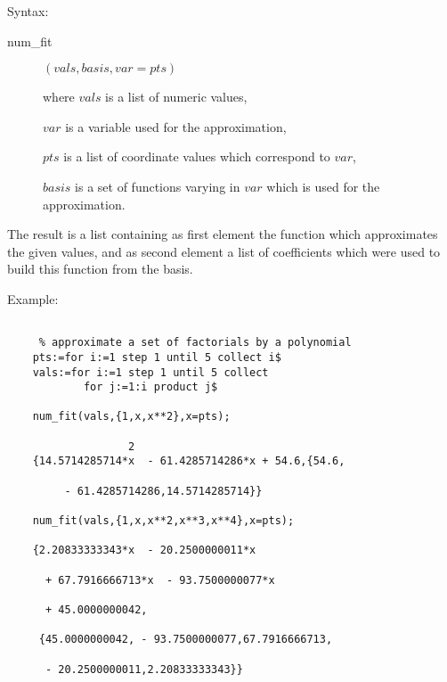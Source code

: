 Syntax:

\begin{description}
\item[num\_fit] $(vals,basis,var=pts)$

where $vals$ is a list of numeric values,

$var$ is a variable used for the approximation,

$pts$ is a list of coordinate values which correspond to $var$,

$basis$ is a set of functions varying in $var$ which is used
  for the approximation.

\end{description}

The result is a list containing as first element the
function which approximates the given values, and as
second element a list of coefficients which were used
to build this function from the basis.

Example:

\begin{verbatim}

     % approximate a set of factorials by a polynomial
    pts:=for i:=1 step 1 until 5 collect i$
    vals:=for i:=1 step 1 until 5 collect
            for j:=1:i product j$

    num_fit(vals,{1,x,x**2},x=pts);

                   2
    {14.5714285714*x  - 61.4285714286*x + 54.6,{54.6,

         - 61.4285714286,14.5714285714}}

    num_fit(vals,{1,x,x**2,x**3,x**4},x=pts);

    {2.20833333343*x  - 20.2500000011*x

      + 67.7916666713*x  - 93.7500000077*x

      + 45.0000000042,

     {45.0000000042, - 93.7500000077,67.7916666713,

      - 20.2500000011,2.20833333343}}
\end{verbatim}

